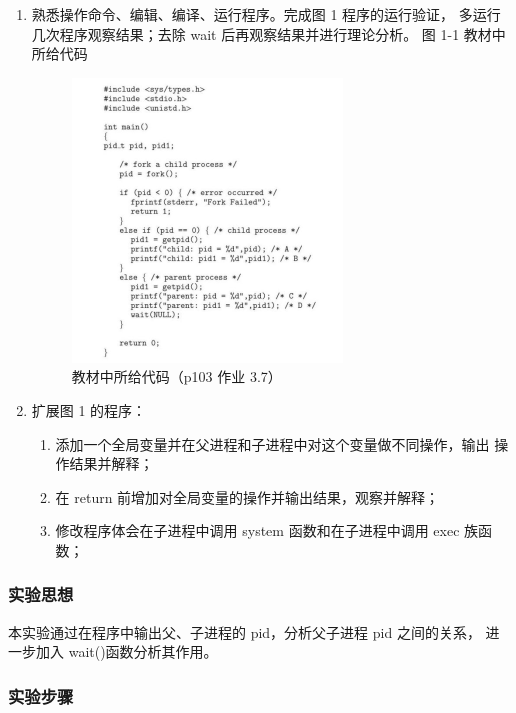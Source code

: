 \documentclass{article}
\begin{document}
    \begin{enumerate}
        \item 熟悉操作命令、编辑、编译、运行程序。完成图 1 程序的运行验证，
        多运行几次程序观察结果；去除 wait 后再观察结果并进行理论分析。
        图 1-1 教材中所给代码
        \begin{figure}[htbp]
            \centering
            \includegraphics[scale=1.2]{picture/1.png}
            \caption{教材中所给代码（p103 作业 3.7）}
            \label{1}
        \end{figure} 
        \item 扩展图 1 的程序：
        \begin{enumerate}
            \item 添加一个全局变量并在父进程和子进程中对这个变量做不同操作，输出
            操作结果并解释；
            \item 在 return 前增加对全局变量的操作并输出结果，观察并解释；
            \item 修改程序体会在子进程中调用 system 函数和在子进程中调用 exec 族函
            数；
        \end{enumerate}
    \end{enumerate}

    \subsubsection{实验思想}
    
    本实验通过在程序中输出父、子进程的 pid，分析父子进程 pid 之间的关系，
    进一步加入 wait()函数分析其作用。

    \subsubsection{实验步骤}
\end{document}

